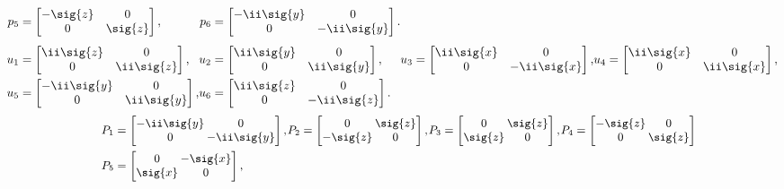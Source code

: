 \begin{unit}
\[\begin{aligned}
\mkern-18mu p_5&=\begin{bmatrix}-\sig{z}&0\\0&\sig{z}\end{bmatrix},&
\mkern-18mu p_6&=\begin{bmatrix}-\ii\sig{y}&0\\0&-\ii\sig{y}\end{bmatrix}.
\\[4pt]
\mkern-18mu u_1&=\begin{bmatrix}\ii\sig{z}&0\\0&\ii\sig{z}\end{bmatrix},&
\mkern-18mu u_2&=\begin{bmatrix}\ii\sig{y}&0\\0&\ii\sig{y}\end{bmatrix},&
\mkern-18mu u_3&=\begin{bmatrix}\ii\sig{x}&0\\0&-\ii\sig{x}\end{bmatrix},&
\mkern-18mu u_4&=\begin{bmatrix}\ii\sig{x}&0\\0&\ii\sig{x}\end{bmatrix},\\
\mkern-18mu u_5&=\begin{bmatrix}-\ii\sig{y}&0\\0&\ii\sig{y}\end{bmatrix},&
\mkern-18mu u_6&=\begin{bmatrix}\ii\sig{z}&0\\0&-\ii\sig{z}\end{bmatrix}.
\end{aligned}
\]
%
\[\small
\setlength{\arraycolsep}{1pt}
\!\begin{aligned}
\mkern-18mu P_1&=\begin{bmatrix}-\ii\sig{y}&0\\0&-\ii\sig{y}\end{bmatrix},&
\mkern-18mu P_2&=\begin{bmatrix}0&\sig{z}\\-\sig{z}&0\end{bmatrix},&
\mkern-18mu P_3&=\begin{bmatrix}0&\sig{z}\\\sig{z}&0\end{bmatrix},&
\mkern-18mu P_4&=\begin{bmatrix}-\sig{z}&0\\0&\sig{z}\end{bmatrix}\\
\mkern-18mu P_5&=\begin{bmatrix}0&-\sig{x}\\ \sig{x}&0\end{bmatrix},&

\end{aligned}\]
\end{unit}
